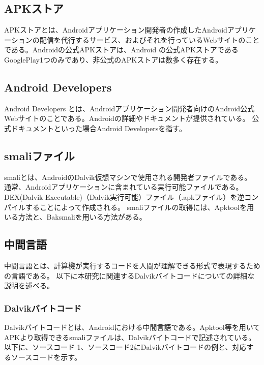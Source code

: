 \subsection{APKストア}
APKストアとは、Androidアプリケーション開発者の作成したAndroidアプリケーションの配信を代行するサービス、およびそれを行っているWebサイトのことである。Androidの公式APKストアは、Android の公式APKストアであるGooglePlay\cite{GooglePlay}1つのみであり、非公式のAPKストアは数多く存在する。


\subsection{Android Developers}
Android Developers とは、Androidアプリケーション開発者向けのAndroid公式Webサイトのことである\cite{Android_Developers}。Androidの詳細やドキュメントが提供されている。
公式ドキュメントといった場合Android Developersを指す。


\subsection{smaliファイル}
smaliとは、AndroidのDalvik仮想マシンで使用される開発者ファイルである。
通常、Androidアプリケーションに含まれている実行可能ファイルである。
DEX(Dalvik Executable)（Dalvik実行可能）ファイル（.apkファイル）を逆コンパイルすることによって作成される。
smaliファイルの取得には、Apktool\cite{Apktool}を用いる方法と、Baksmali\cite{Baksmali}を用いる方法がある。


\subsection{中間言語}
中間言語とは、計算機が実行するコードを人間が理解できる形式で表現するための言語である。
以下に本研究に関連するDalvikバイトコードについての詳細な説明を述べる。


\subsubsection{Dalvikバイトコード}
Dalvikバイトコードとは、Androidにおける中間言語である。Apktool等を用いてAPKより取得できるsmaliファイルは、Dalvikバイトコードで記述されている。以下に、ソースコード 1、ソースコード2にDalvikバイトコードの例と、対応するソースコードを示す。

